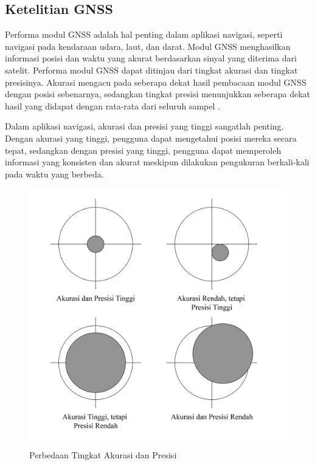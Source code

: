 \subsection{Ketelitian GNSS}
Performa modul GNSS adalah hal penting dalam aplikasi navigasi, seperti navigasi pada kendaraan udara, laut, dan darat. Modul GNSS menghasilkan informasi posisi dan waktu yang akurat berdasarkan sinyal yang diterima dari satelit. Performa modul GNSS dapat ditinjau dari tingkat akurasi dan tingkat presisinya. Akurasi mengacu pada seberapa dekat hasil pembacaan modul GNSS dengan posisi sebenarnya, sedangkan tingkat presisi menunjukkan seberapa dekat hasil yang didapat dengan rata-rata dari seluruh sampel \cite{Novatel2023}. 

Dalam aplikasi navigasi, akurasi dan presisi yang tinggi sangatlah penting. Dengan akurasi yang tinggi, pengguna dapat mengetahui posisi mereka secara tepat, sedangkan dengan presisi yang tinggi, pengguna dapat memperoleh informasi yang konsisten dan akurat meskipun dilakukan pengukuran berkali-kali pada waktu yang berbeda.

\begin{figure}[H]
	\centering
	\includegraphics[width=12cm]{contents/chapter-2/acc.png}
	\caption{Perbedaan Tingkat Akurasi dan Presisi}
	\label{Fig: acc-and-prec-diff}
\end{figure}


